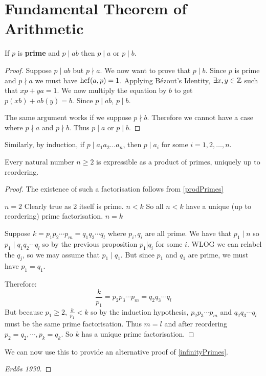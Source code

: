 \documentclass[../main.tex]{subfiles}
\begin{document}
\section{Fundamental Theorem of Arithmetic}
\begin{proposition}
  If $p$ is \textbf{prime} and $p \mid ab$ then $p \mid a$ or $p \mid b$.
\end{proposition}
\begin{proof}
  Suppose $p \mid ab$ but $p \nmid a$. We now want to prove that $p \mid b$.
  Since $p$ is prime and $p \nmid a$ we must have $\operatorname{hcf}(a, p) = 1$.
  Applying B\'ezout's Identity, $\exists x, y \in \mathbb{Z}$ such that $xp + ya = 1$.
  We now multiply the equation by $b$ to get $p(xb) + ab(y) = b$.
  Since $p \mid ab$, $p \mid b$.

  The same argument works if we suppose $p \nmid b$.
  Therefore we cannot have a case where $p \nmid a$ and $p \nmid b$.
  Thus $p \mid a$ or $p \mid b$.
\end{proof}
\begin{remark}
  Similarly, by induction, if $p \mid a_1 a_2 \ldots a_n$, then $p \mid a_i$  for some $i = 1, 2, \ldots, n$.
\end{remark}
\begin{theorem}
  Every natural number $n \geq 2$ is expressible as a product of primes, uniquely up to reordering.
\end{theorem}
\begin{proof}
  The existence of such a factorisation follows from \cref{prodPrimes}\par
  \induction
  {$n = 2$}{
    Clearly true as 2 itself is prime.
  }
  {$n < k$}{
    So all $n < k$ have a unique (up to reordering) prime factorisation.
  }
  {$n = k$}{
    Suppose $k = p_1 p_2 \cdots p_m = q_1 q_2 \cdots q_l$ where $p_i, q_i$ are all prime.
    We have that $p_1 \mid n$ so $p_1 \mid q_1 q_2 \cdots q_l$ so by the previous proposition $p_1 | q_i$ for some $i$.
    WLOG we can relabel the $q_j$, so we may assume that $p_1 \mid q_1$.
    But since $p_1$ and $q_1$ are prime, we must have $p_1 = q_1$.

    Therefore:
    \[
      \frac{k}{p_1} = p_2 p_3\cdots p_m = q_2 q_3 \cdots q_l
    \]
    But because $p_1 \geq 2$, $\frac{k}{p_1} < k$ so by the induction hypothesis, $p_2 p_3 \cdots p_m$ and $q_2 q_3 \cdots q_l$ must be the same prime factorisation.
    Thus $m=l$ and after reordering $p_2 = q_2, \cdots, p_k = q_k$.
    So $k$ has a unique prime factorisation.
  }
\end{proof}
We can now use this to provide an alternative proof of \cref{infinityPrimes}.
\begin{proof}[Erd\H{o}s 1930]

\end{proof}
\end{document}
